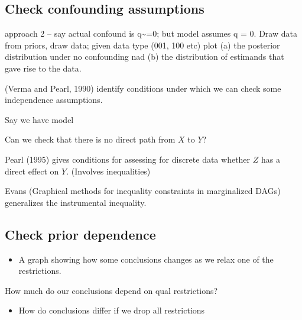 \documentclass[12pt,]{book}
\newenvironment{Shaded}{\begin{snugshade}}{\end{snugshade}}
\newcommand{\DataTypeTok}[1]{\textcolor[rgb]{0.13,0.29,0.53}{#1}}
\newcommand{\KeywordTok}[1]{\textcolor[rgb]{0.13,0.29,0.53}{\textbf{#1}}}
\newcommand{\NormalTok}[1]{#1}
\newcommand{\OperatorTok}[1]{\textcolor[rgb]{0.81,0.36,0.00}{\textbf{#1}}}
\newcommand{\StringTok}[1]{\textcolor[rgb]{0.31,0.60,0.02}{#1}}
\providecommand{\tightlist}{%
  \setlength{\itemsep}{0pt}\setlength{\parskip}{0pt}}
\begin{document}
\hypertarget{check-confounding-assumptions}{%
\subsection{Check confounding assumptions}\label{check-confounding-assumptions}}

approach 2 -- say actual confound is q\textasciitilde{}=0; but model assumes q = 0. Draw data from priors, draw data; given data type (001, 100 etc) plot (a) the posterior distribution under no confounding nad (b) the distribution of estimands that gave rise to the data.

(Verma and Pearl, 1990) identify conditions under which we can check some independence assumptions.

Say we have model

\begin{Shaded}
\end{Shaded}

Can we check that there is no direct path from \(X\) to \(Y\)?

Pearl (1995) gives conditions for assessing for discrete data whether \(Z\) has a direct effect on \(Y\). (Involves inequalities)

Evans (Graphical methods for inequality constraints in marginalized DAGs) generalizes the instrumental inequality.

\hypertarget{check-prior-dependence}{%
\subsection{Check prior dependence}\label{check-prior-dependence}}

\begin{itemize}
\tightlist
\item
  A graph showing how some conclusions changes as we relax one of the restrictions.
\end{itemize}

How much do our conclusions depend on qual restrictions?

\begin{itemize}
\tightlist
\item
  How do conclusions differ if we drop all restrictions
\end{itemize}
\end{document}
